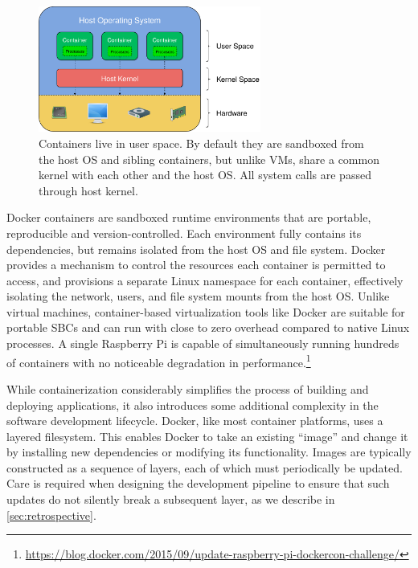 \documentclass[12pt,initial,twoside,maitrise]{dms}
\numberwithin{equation}{section}
\numberwithin{table}{chapter}
\numberwithin{figure}{chapter}
\begin{document}
\begin{figure}[ht]
    \centering
    \includegraphics[width=0.65\textwidth]{../figures/user_kernel_hardware.png}
    \caption{Containers live in user space. By default they are sandboxed from the host OS and sibling containers, but unlike VMs, share a common kernel with each other and the host OS. All system calls are passed through host kernel.}
    \label{fig:user_kernel_hardware}
\end{figure}

Docker containers are sandboxed runtime environments that are portable, reproducible and version-controlled. Each environment fully contains its dependencies, but remains isolated from the host OS and file system. Docker provides a mechanism to control the resources each container is permitted to access, and provisions a separate Linux namespace for each container, effectively isolating the network, users, and file system mounts from the host OS. Unlike virtual machines, container-based virtualization tools like Docker are suitable for portable SBCs and can run with close to zero overhead compared to native Linux processes. A single Raspberry Pi is capable of simultaneously running hundreds of containers with no noticeable degradation in performance.\hspace{-.08em}\footnote{\url{https://blog.docker.com/2015/09/update-raspberry-pi-dockercon-challenge/}}

While containerization considerably simplifies the process of building and deploying applications, it also introduces some additional complexity in the software development lifecycle. Docker, like most container platforms, uses a layered filesystem. This enables Docker to take an existing ``image'' and change it by installing new dependencies or modifying its functionality. Images are typically constructed as a sequence of layers, each of which must periodically be updated. Care is required when designing the development pipeline to ensure that such updates do not silently break a subsequent layer, as we describe in \autoref{sec:retrospective}.
\end{document}
